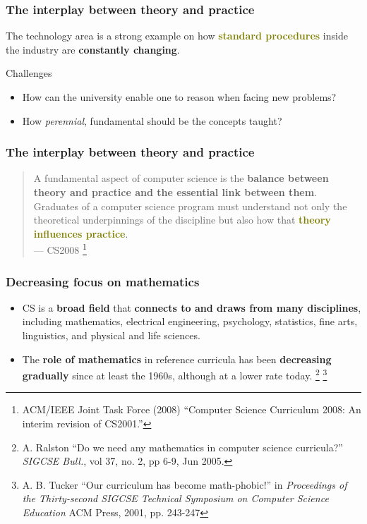 \documentclass{beamer}
\begin{document}
\begin{frame}
\frametitle{The interplay between theory and practice}
The technology area is a strong example on how \textbf{\textcolor{olive}{standard procedures}} inside the
industry are \textbf{\textcolor{n_red}{constantly changing}}.

\begin{block}{Challenges}
	\begin{itemize}
		\item How can the university enable one to reason when facing new
		problems?
		\item How \emph{perennial}, fundamental should be the concepts taught?
		
	\end{itemize}
\end{block}

\end{frame}

\begin{frame}
\frametitle{The interplay between theory and practice}
\begin{quote}
A fundamental aspect of computer science is the 
\textbf{\textcolor{n_red}{balance between theory and
practice and the essential link between them}}. Graduates of a computer science
program must understand not only the theoretical underpinnings of the discipline
but also how that \textbf{\textcolor{olive}{theory influences practice}}. \\
\hfill --- \textup{CS2008}
\footnote{\tiny ACM/IEEE Joint Task Force (2008) ``Computer Science Curriculum
2008: An interim revision of CS2001.''}

\end{quote}
\end{frame}

\begin{frame}
\frametitle{Decreasing focus on mathematics}
\begin{itemize}
	\item CS is a \textbf{\textcolor{n_violet}{broad field}} that
	\textbf{\textcolor{n_blue}{connects to and draws from many disciplines}}, 
	including mathematics, electrical engineering, psychology, statistics, fine 
	arts, linguistics, and physical and life sciences.
	\item The \textbf{\textcolor{n_green}{role of mathematics}} in reference
	curricula has been \textbf{\textcolor{n_red}{decreasing gradually}} since at
	least the 1960s, although at a lower rate today. 
	\footnote{\tiny A. Ralston ``Do we need any mathematics in computer science
	curricula?'' \emph{SIGCSE Bull.}, vol 37, no. 2, pp 6-9, Jun 2005.}
	\footnote{\tiny A. B. Tucker ``Our curriculum has become math-phobic!'' in
	\emph{Proceedings of the Thirty-second SIGCSE Technical Symposium on
	Computer Science Education} ACM Press, 2001, pp. 243-247}

\end{itemize}

\end{frame}
\end{document}

